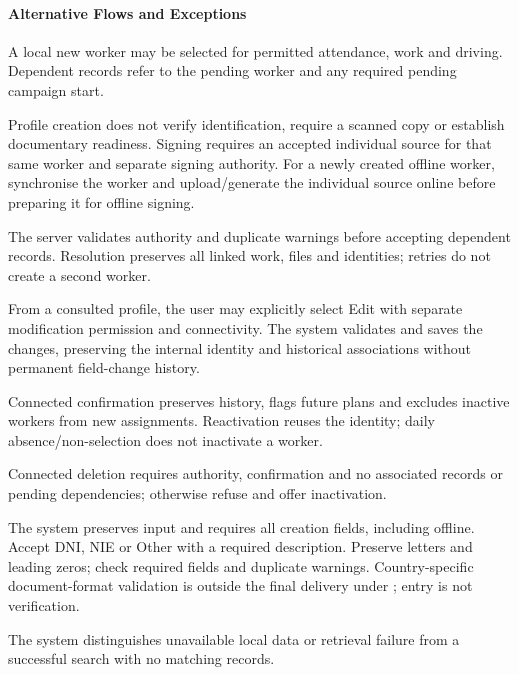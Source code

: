 \paragraph{Alternative Flows and Exceptions}
\begin{description}[style=nextline]
\item[A1 --- Immediate field use.] A local new worker may be selected for permitted
attendance, work and driving. Dependent records
refer to the pending worker and any required pending campaign start.
\item[A2 --- Document prerequisites.] Profile creation does not verify identification,
require a scanned copy or establish documentary readiness. Signing requires
an accepted individual source for that same worker and separate signing authority.
For a newly created offline worker, synchronise the worker and upload/generate the
individual source online before preparing it for offline signing.
\item[A3 --- Reconnection and duplicates.] The server validates authority and
duplicate warnings before accepting dependent records. Resolution preserves all
linked work, files and identities; retries do not create a second worker.
\item[A4 --- Update.] From a consulted profile, the user may explicitly select Edit
with separate modification permission and connectivity. The system validates and
saves the changes, preserving the internal identity and historical associations
without permanent field-change history.
\item[A5 --- Inactivate/reactivate.] Connected confirmation preserves history,
flags future plans and excludes inactive workers from new assignments. Reactivation
reuses the identity; daily absence/non-selection does not inactivate a worker.
\item[A6 --- Delete.] Connected deletion requires authority, confirmation and no
associated records or pending dependencies; otherwise refuse and offer inactivation.
\item[A7 --- Missing or invalid information.] The system preserves input and
requires all creation fields, including offline. Accept DNI, NIE or Other with a required description. Preserve letters and leading zeros; check required fields and duplicate warnings. Country-specific document-format validation is outside the final delivery under ; entry is not verification.
\item[A8 --- Unavailable consultation.] The system distinguishes unavailable local
data or retrieval failure from a successful search with no matching records.

\end{description}
